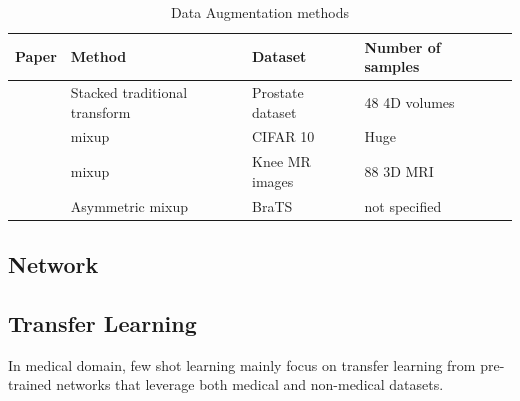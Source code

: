 %


\begin{table}
\begin{tabular}{lllll}
\hline
Paper                                             & Method                        & Dataset              & Number of samples &  \\
\hline
\cite{zhang_when_2019}       & Stacked traditional transform & Prostate dataset     & 48 4D volumes     &  \\
\cite{zhang_mixup_2018}       & mixup                         & CIFAR 10             & Huge              &  \\
\cite{panfilov_improving_2019} & mixup                         & Knee MR images       & 88 3D MRI         &  \\
\cite{li_overfitting_2019}   & Asymmetric mixup              & BraTS               &  not specified             &  \\
\hline
\end{tabular}
\caption{Data Augmentation methods}
\label{tab:Augtable}
\end{table}

\subsection{Network}

\subsection{Transfer Learning}
In medical domain, few shot learning mainly focus on transfer learning from pre-trained networks that leverage both medical and non-medical datasets.\\

